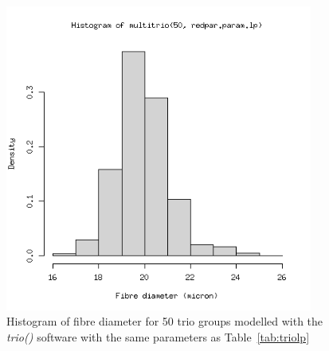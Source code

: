 %

\begin{figure}[h]
  \centering
   \includegraphics[width=0.9\textwidth]{diamhist50.png}
  \caption{Histogram of fibre diameter for 50 trio groups modelled with the {\em trio()} software with the same parameters as Table~\ref{tab:triolp}}
  \label{fig:diamhist50}
\end{figure}

%

